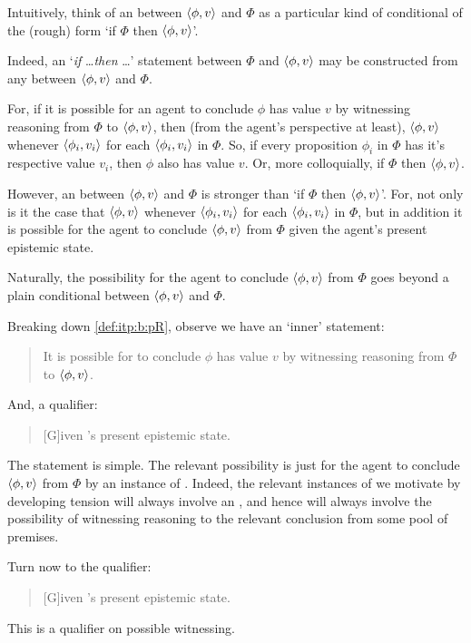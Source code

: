 \begin{note}
  Intuitively, think of an \itp{} between \(\langle \phi, v \rangle\) and \(\Phi\) as a particular kind of conditional of the (rough) form `if \(\Phi\) then \(\langle \phi, v \rangle\)'.

  Indeed, an `\emph{if} \dots \emph{then} \dots' statement between \(\Phi\) and \(\langle \phi, v \rangle\) may be constructed from any \itp{} between \(\langle \phi, v \rangle\) and \(\Phi\).

  For, if it is possible for an agent to conclude \(\phi\) has value \(v\) by witnessing reasoning from \(\Phi\) to \(\langle \phi, v \rangle\), then (from the agent's perspective at least), \(\langle \phi, v \rangle\) whenever \(\langle \phi_{i}, v_{i} \rangle\) for each \(\langle \phi_{i}, v_{i} \rangle\) in \(\Phi\).
  So, if every proposition \(\phi_{i}\) in \(\Phi\) has it's respective value \(v_{i}\), then \(\phi\) also has value \(v\).
  Or, more colloquially, if \(\Phi\) then \(\langle \phi, v \rangle\).

  However, an \itp{} between \(\langle \phi, v \rangle\) and \(\Phi\) is stronger than `if \(\Phi\) then \(\langle \phi, v \rangle\)'.
  For, not only is it the case that \(\langle \phi, v \rangle\) whenever \(\langle \phi_{i}, v_{i} \rangle\) for each \(\langle \phi_{i}, v_{i} \rangle\) in \(\Phi\), but in addition it is possible for the agent to conclude \(\langle \phi, v \rangle\) from \(\Phi\) given the agent's present epistemic state.

  Naturally, the possibility for the agent to conclude \(\langle \phi, v \rangle\) from \(\Phi\) goes beyond a plain conditional between \(\langle \phi, v \rangle\) and \(\Phi\).

  Breaking down \autoref{def:itp:b:pR}, observe we have an `inner' statement:
  \begin{quote}
     It is possible for \vAgent{} to conclude \(\phi\) has value \(v\) by witnessing reasoning from \(\Phi\) to \(\langle \phi, v \rangle\).
  \end{quote}
  And, a qualifier:
  \begin{quote}
    [G]iven \vAgent{}'s present epistemic state.
  \end{quote}

  The statement is simple.
  The relevant possibility is just for the agent to conclude \(\langle \phi, v \rangle\) from \(\Phi\) by an instance of \adA{}.
  Indeed, the relevant instances of \EAS{} we motivate by developing tension will always involve an \itp{}, and hence will always involve the possibility of witnessing reasoning to the relevant conclusion from some pool of premises.

  Turn now to the qualifier:
  \begin{quote}
    [G]iven \vAgent{}'s present epistemic state.
  \end{quote}
  This is a qualifier on possible witnessing.


\end{note}
